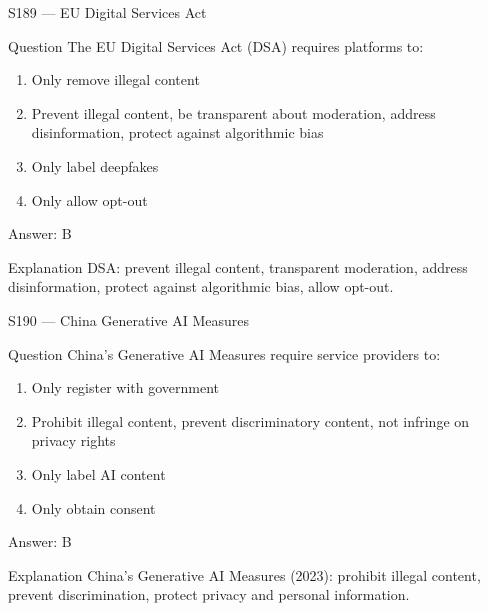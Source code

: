 \documentclass[aspectratio=169,8pt]{beamer}
\begin{document}
	\begin{frame}{S189 --- EU Digital Services Act}
		\begin{block}{Question}
			The EU Digital Services Act (DSA) requires platforms to:
			\begin{enumerate}
				\item Only remove illegal content
				\item Prevent illegal content, be transparent about moderation, address disinformation, protect against algorithmic bias
				\item Only label deepfakes
				\item Only allow opt-out
			\end{enumerate}
		\end{block}
		\begin{exampleblock}{Answer: B}\end{exampleblock}
		\begin{block}{Explanation}
			DSA: prevent illegal content, transparent moderation, address disinformation, protect against algorithmic bias, allow opt-out.
		\end{block}
	\end{frame}
	
	\begin{frame}{S190 --- China Generative AI Measures}
		\begin{block}{Question}
			China's Generative AI Measures require service providers to:
			\begin{enumerate}
				\item Only register with government
				\item Prohibit illegal content, prevent discriminatory content, not infringe on privacy rights
				\item Only label AI content
				\item Only obtain consent
			\end{enumerate}
		\end{block}
		\begin{exampleblock}{Answer: B}\end{exampleblock}
		\begin{block}{Explanation}
			China's Generative AI Measures (2023): prohibit illegal content, prevent discrimination, protect privacy and personal information.
		\end{block}
	\end{frame}
	
\end{document}
